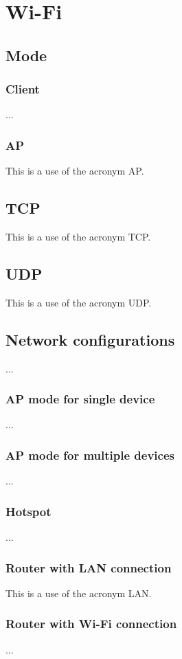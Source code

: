 \section{Wi-Fi}

\subsection{Mode}

\subsubsection{Client}

...

\subsubsection{\acs{AP}}

This is a use of the acronym \ac{AP}.

\subsection{\acs{TCP}}

This is a use of the acronym \ac{TCP}.

\subsection{\acs{UDP}}

This is a use of the acronym \ac{UDP}.

\subsection{Network configurations}

...

\subsubsection{\acs{AP} mode for single device}

...

\subsubsection{\acs{AP} mode for multiple devices}

...

\subsubsection{Hotspot}

...

\subsubsection{Router with \acs{LAN} connection}

This is a use of the acronym \ac{LAN}.

\subsubsection{Router with Wi-Fi connection}

...

